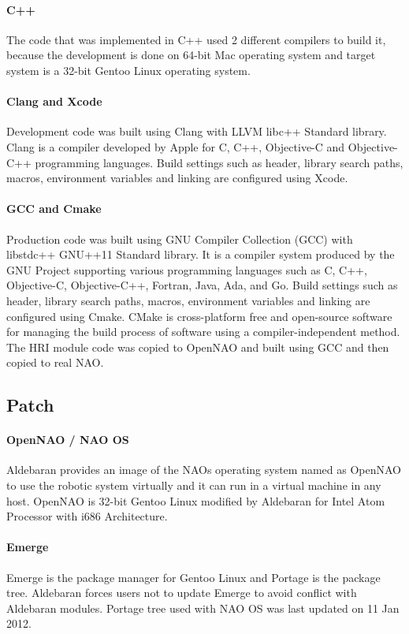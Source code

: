 \paragraph*{C++} The code that was implemented in C++ used 2 different compilers to build it, because the development is done on 64-bit Mac operating system and target system is a 32-bit Gentoo Linux operating system. 

\paragraph*{\indent Clang and Xcode} Development code was built using Clang with LLVM libc++ Standard library. Clang is a compiler developed by Apple for C, C++, Objective-C and Objective-C++ programming languages. Build settings such as header, library search paths, macros, environment variables and linking are configured using Xcode. 

\paragraph*{\indent GCC and Cmake} Production code was built using GNU Compiler Collection (GCC) with libstdc++ GNU++11 Standard library. It is a compiler system produced by the GNU Project supporting various programming languages such as C, C++, Objective-C, Objective-C++, Fortran, Java, Ada, and Go.  Build settings such as header, library search paths, macros, environment variables and linking are configured using Cmake. CMake is cross-platform free and open-source software for managing the build process of software using a compiler-independent method. The HRI module code was copied to OpenNAO and built using GCC and then copied to real NAO. 

\subsection{Patch}
\paragraph*{OpenNAO / NAO OS} Aldebaran provides an image of the NAOs operating system named as OpenNAO to use the robotic system virtually and it can run in a virtual machine in any host. OpenNAO is 32-bit Gentoo Linux modified by Aldebaran for Intel Atom Processor with i686 Architecture. 

\paragraph*{Emerge} Emerge is the package manager for Gentoo Linux and Portage is the package tree.  Aldebaran forces users not to update Emerge to avoid conflict with Aldebaran modules. Portage tree used with NAO OS was last updated on 11 Jan 2012. 

